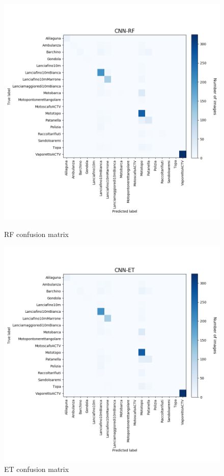 \documentclass[12pt]{article}
\begin{document}
\begin{figure}[!ht]
	\centering
	\begin{minipage}{.5\textwidth}
		\centering
		\includegraphics[width=.9\linewidth]{../code/output/CNN-RF.png}
		\caption{RF confusion matrix} %
		\label{fig:cnf_rf}
	\end{minipage}%
	\begin{minipage}{.5\textwidth}
		\centering
		\includegraphics[width=.9\linewidth]{../code/output/CNN-ET.png}
		\caption{ET confusion matrix} %
		\label{fig:cnf_et}
	\end{minipage}
\end{figure}
\end{document}
